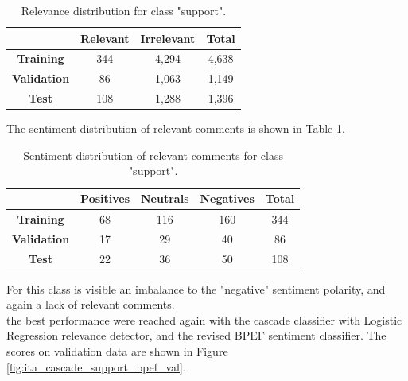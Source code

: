 \begin{table}[H]
	\centering
	\begin{tabular}{ | c  c  c | c | } 
		\hline
		& \textbf{Relevant} & \textbf{Irrelevant} & \textbf{Total} \\
		\hline
		\textbf{Training} & 344 & 4,294 & 4,638 \\ 
		\hline
		\textbf{Validation} & 86 & 1,063 & 1,149 \\ 
		\hline
		\textbf{Test} & 108 & 1,288 & 1,396 \\
		\hline
	\end{tabular}
	\caption{Relevance distribution for class "support".}
	\label{table:rel-dist-support}
\end{table}

The sentiment distribution of relevant comments is shown in Table \ref{table:rel-dist-support}.

\begin{table}[H]
	\centering
	\begin{tabular}{ | c  c  c c | c | } 
		\hline
		& \textbf{Positives} & \textbf{Neutrals} & \textbf{Negatives} & \textbf{Total} \\
		\hline
		\textbf{Training} & 68 & 116 & 160 & 344 \\ 
		\hline
		\textbf{Validation} & 17 & 29 & 40 & 86 \\ 
		\hline
		\textbf{Test} & 22 & 36 & 50 & 108 \\
		\hline
	\end{tabular}
	\label{table:snt-dist-support}
	\caption{Sentiment distribution of relevant comments for class "support".}
\end{table}

For this class is visible an imbalance to the "negative" sentiment polarity, and again a lack of relevant comments.\\
the best performance were reached again with the cascade classifier with Logistic Regression relevance detector, and the revised BPEF sentiment classifier. The scores on validation data are shown in Figure \ref{fig:ita_cascade_support_bpef_val}.


